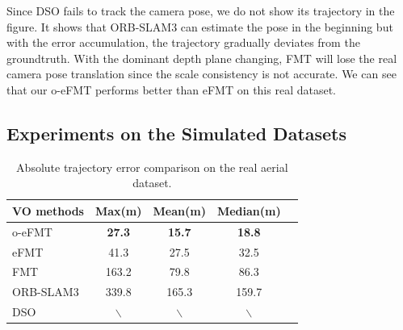 \documentclass[letterpaper, 10 pt, conference]{ieeeconf}  %
\begin{document}
Since DSO fails to track the camera pose, we do not show its trajectory in the figure. It shows that ORB-SLAM3 can estimate the pose in the beginning but with the error accumulation, the trajectory gradually deviates from the groundtruth. With the dominant depth plane changing, FMT will lose the real camera pose translation since the scale consistency is not accurate. We can see that our o-eFMT performs better than eFMT on this real dataset.

\subsection{Experiments on the Simulated Datasets}

\begin{table}[t]
    \centering
    \caption{Absolute trajectory error comparison on the real aerial dataset.}
    \label{tab:realError_tab}
    \begin{tabular}{lcccr}
    \toprule
        \textbf{VO methods} & \textbf{Max(m)} & \textbf{Mean(m)}& \textbf{Median(m)}\\ \midrule
        o-eFMT & \textbf{27.3} & \textbf{15.7} & \textbf{18.8} \\
        eFMT& 41.3 & 27.5 & 32.5  \\ 
        FMT & 163.2 & 79.8 & 86.3 \\
        ORB-SLAM3 & 339.8 & 165.3 & 159.7 \\
        DSO & $\backslash$ & $\backslash$ & $\backslash$ \\
    \bottomrule
    \end{tabular}
\end{table}
\end{document}
